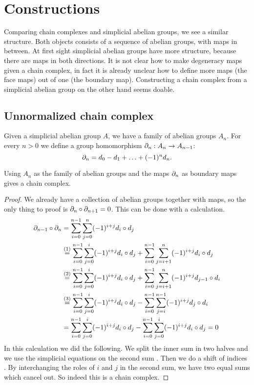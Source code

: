 \section{Constructions}
\label{sec:Constructions}

Comparing chain complexes and simplicial abelian groups, we see a similar structure. Both objects consists of a sequence of abelian groups, with maps in between. At first sight simplicial abelian groups have more structure, because there are maps in both directions. It is not clear how to make degeneracy maps given a chain complex, in fact it is already unclear how to define more maps (the face maps) out of one (the boundary map). Constructing a chain complex from a simplicial abelian group on the other hand seems doable.

\subsection{Unnormalized chain complex}
Given a simplicial abelian group $A$, we have a family of abelian groups $A_n$. For every $n>0$ we define a group homomorphism $\partial_n : A_n \to A_{n-1}$:
$$\partial_n = d_0 - d_1 + \ldots + (-1)^n d_n.$$
\begin{lemma}
	Using $A_n$ as the family of abelian groups and the maps $\partial_n$ as boundary maps gives a chain complex.
\end{lemma}
\begin{proof}
	We already have a collection of abelian groups together with maps, so the only thing to proof is $\partial_n \circ \partial_{n+1} = 0$. This can be done with a calculation.
	\begin{align*}
		\partial_{n-1} \circ \partial_n &= \sum_{i=0}^{n-1}  \sum_{j=0}^{n} (-1)^{i+j} d_i \circ d_j \\
			&\stackrel{(1)}{=} \sum_{i=0}^{n-1} \sum_{j=0}^{i} (-1)^{i+j} d_i \circ d_j + \sum_{i=0}^{n-1} \sum_{j=i+1}^{n} (-1)^{i+j} d_i \circ d_j \\
			&\stackrel{(2)}{=} \sum_{i=0}^{n-1} \sum_{j=0}^{i} (-1)^{i+j} d_i \circ d_j + \sum_{i=0}^{n-1} \sum_{j=i+1}^{n} (-1)^{i+j} d_{j-1} \circ d_i \\
			&\stackrel{(3)}{=} \sum_{i=0}^{n-1} \sum_{j=0}^{i} (-1)^{i+j} d_i \circ d_j - \sum_{i=0}^{n-1} \sum_{j=i}^{n-1} (-1)^{i+j} d_j \circ d_i \\
			&= \sum_{i=0}^{n-1} \sum_{j=0}^{i} (-1)^{i+j} d_i \circ d_j - \sum_{i=0}^{n-1} \sum_{j=0}^{i} (-1)^{i+j} d_i \circ d_j = 0
	\end{align*}
	In this calculation we did the following. We split the inner sum in two halves  and we use the simplicial equations on the second sum . Then we do a shift of indices . By interchanging the roles of $i$ and $j$ in the second sum, we have two equal sums which cancel out. So indeed this is a chain complex.
\end{proof}

